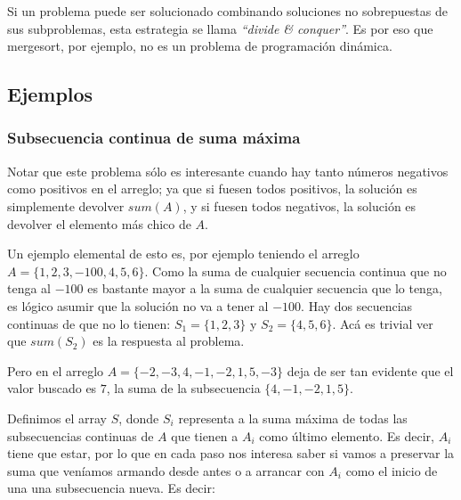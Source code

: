 Si un problema puede ser solucionado combinando soluciones no sobrepuestas de sus subproblemas, esta estrategia se llama \emph{``divide \& conquer''}. Es por eso que mergesort, por ejemplo, no es un problema de programaci\'on din\'amica.

\newpage
\subsection{Ejemplos}

\subsubsection{Subsecuencia continua de suma m\'axima}


\noindent{}

Notar que este problema s\'olo es interesante cuando hay tanto n\'umeros negativos como positivos en el arreglo; ya que si fuesen todos positivos, la soluci\'on es simplemente devolver $sum(A)$, y si fuesen todos negativos, la soluci\'on es devolver el elemento m\'as chico de $A$.

Un ejemplo elemental de esto es, por ejemplo teniendo el arreglo $A = \{ 1, 2, 3, -100, 4, 5, 6\}$. Como la suma de cualquier secuencia continua que no tenga al $-100$ es bastante mayor a la suma de cualquier secuencia que lo tenga, es l\'ogico asumir que la soluci\'on no va a tener al $-100$. Hay dos secuencias continuas de que no lo tienen: $S_1 = \{ 1, 2, 3\}$ y $S_2 = \{ 4, 5, 6\}$. Ac\'a es trivial ver que $sum(S_2)$ es la respuesta al problema.

Pero en el arreglo $A = \{-2, -3, 4, -1, -2, 1, 5, -3\}$ deja de ser tan evidente que el valor buscado es $7$, la suma de la subsecuencia $\{4, -1, -2, 1, 5\}$.

Definimos el array $S$, donde $S_i$ representa a la suma m\'axima de todas las subsecuencias continuas de $A$ que tienen a $A_i$ como \'ultimo elemento. Es decir, $A_i$ tiene que estar, por lo que en cada paso nos interesa saber si vamos a preservar la suma que ven\'iamos armando desde antes o a arrancar con $A_i$ como el inicio de una una subsecuencia nueva. Es decir:

